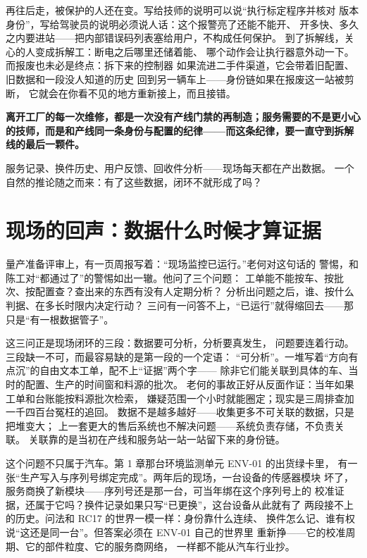 再往后走，被保护的人还在变。写给技师的说明可以说“执行标定程序并核对
版本身份”，写给驾驶员的说明必须说人话：这个报警亮了还能不能开、
开多快、多久之内要进站——把内部错误码列表塞给用户，不构成任何保护。
到了拆解线，关心的人变成拆解工：断电之后哪里还储着能、
哪个动作会让执行器意外动一下。而报废也未必是终点：拆下来的控制器
如果流进二手件渠道，它会带着旧配置、旧数据和一段没人知道的历史
回到另一辆车上——身份链如果在报废这一站被剪断，
它就会在你看不见的地方重新接上，而且接错。

\textbf{离开工厂的每一次维修，都是一次没有产线门禁的再制造；服务需要的不是更小心的技师，而是和产线同一条身份与配置的纪律——而这条纪律，要一直守到拆解线的最后一颗件。}

服务记录、换件历史、用户反馈、回收件分析——现场每天都在产出数据。
一个自然的推论随之而来：有了这些数据，闭环不就形成了吗？

\section{现场的回声：数据什么时候才算证据}

量产准备评审上，有一页周报写着：“现场监控已运行。”老何对这句话的
警惕，和陈工对“都通过了”的警惕如出一辙。他问了三个问题：
工单能不能按车、按批次、按配置查？查出来的东西有没有人定期分析？
分析出问题之后，谁、按什么判据、在多长时限内决定行动？
三问有一问答不上，“已运行”就得缩回去——那只是“有一根数据管子”。

这三问正是现场闭环的三段：数据要可分析，分析要真发生，
问题要连着行动。三段缺一不可，而最容易缺的是第一段的一个定语：
“可分析”。一堆写着“方向有点沉”的自由文本工单，配不上“证据”两个字——
除非它们能关联到具体的车、当时的配置、生产的时间窗和料源的批次。
老何的事故正好从反面作证：当年如果工单和台账能按料源批次检索，
嫌疑范围一个小时就能圈定；现实是三周排查加一千四百台冤枉的追回。
数据不是越多越好——收集更多不可关联的数据，只是把堆变大；
上一套更大的售后系统也不解决问题——系统负责存储，不负责关联。
关联靠的是当初在产线和服务站一站一站留下来的身份链。

这个问题不只属于汽车。第 1 章那台环境监测单元 ENV-01 的出货绿卡里，
有一张“生产写入与序列号绑定完成”。两年后的现场，一台设备的传感器模块
坏了，服务商换了新模块——序列号还是那一台，可当年绑在这个序列号上的
校准证据，还属于它吗？换件记录如果只写“已更换”，这台设备从此就有了
两段接不上的历史。问法和 RC17 的世界一模一样：身份靠什么连续、
换件怎么记、谁有权说“这还是同一台”。但答案必须在 ENV-01 自己的世界里
重新挣——它的校准周期、它的部件粒度、它的服务商网络，
一样都不能从汽车行业抄。

